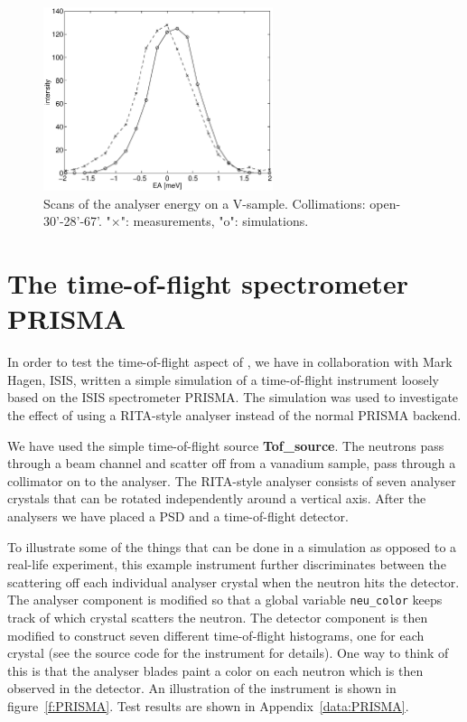 \begin{figure}
  \begin{center}
    \includegraphics[width=0.6\textwidth]{figures/ea-scan.eps}
  \end{center}
\caption{Scans of the analyser energy on a V-sample.
Collimations: open-30'-28'-67'.
"$\times$": measurements, "o": simulations.}
\label{f:v_ea}
\end{figure}


\section{The time-of-flight spectrometer PRISMA}
\label{s:PRISMA} 

In order to test the time-of-flight aspect of \MCS, we have
in collaboration with Mark Hagen, ISIS, written a simple
simulation of a time-of-flight instrument loosely based on the ISIS
spectrometer PRISMA. The simulation was used to investigate the effect
of using a RITA-style analyser instead of the normal PRISMA backend.

We have used the simple time-of-flight source {\bf Tof\_source}. 
The neutrons pass through a
beam channel and scatter off from a vanadium sample, pass through
a collimator on to the analyser.
The RITA-style analyser consists of seven analyser crystals
that can be rotated independently around a vertical axis. After the
analysers we have placed a PSD and a time-of-flight detector.

To illustrate some of the things that can be done in a simulation as
opposed to a real-life experiment, this example instrument further
discriminates between
the scattering off each individual analyser crystal 
when the neutron hits the detector. The
analyser component is modified so that a global variable 
\verb+neu_color+ keeps track of which
crystal scatters the neutron. The detector component
is then modified to construct seven different time-of-flight histograms,
one for each crystal (see the source code for the instrument  
for details). One way to think of this is that
the analyser blades paint a color on each neutron which is then
observed in the detector.
An illustration of the instrument is shown in figure~\ref{f:PRISMA}.
Test results are shown in Appendix~\ref{data:PRISMA}.

